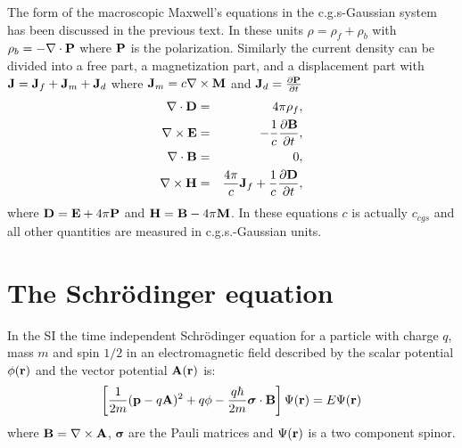 \documentclass[12pt,a4paper]{article}
\begin{document}
{\color{orange} The form of the macroscopic Maxwell's equations
in the c.g.s-Gaussian system has been discussed in the previous text.
In these units $\rho=\rho_f+\rho_b$ with $\rho_b=-\nabla \cdot {\bf P}$
where ${\bf P}$ is the polarization.
Similarly the current density can be divided into a free part, a 
magnetization part,
and a displacement part with ${\bf J}={\bf J}_f + {\bf J}_m + {\bf J}_d$ where
${\bf J}_m=c \nabla \times {\bf M}$ and ${\bf J}_d={\partial {\bf P}\over 
\partial t}$
\begin{eqnarray}
\nabla \cdot {\bf D} &=& 4 \pi \rho_f, \\
\nabla \times {\bf E} &=& -{1\over c} {\partial {\bf B} \over \partial t}, \\
\nabla \cdot {\bf B} &=& 0, \\
\nabla \times {\bf H} &=& {4 \pi \over c} {\bf J}_f+ {1\over c}
{\partial {\bf D} \over \partial t}, 
\end{eqnarray}
where ${\bf D}={\bf E} + 4 \pi {\bf P}$ and ${\bf H}={\bf B}- 4 \pi {\bf M}$.
In these equations $c$ is actually $c_{cgs}$ and all 
other quantities are measured in c.g.s.-Gaussian units.
}

\newpage
\section{\color{coral}The Schr\"odinger equation}
In the SI the time independent Schr\"odinger equation for a particle 
with charge $q$, mass $m$ and spin $1/2$ in an electromagnetic field 
described by the scalar potential $\phi({\bf r})$ and the vector
potential ${\bf A}({\bf r})$ is:
\begin{equation}
\left[{1\over 2m} ({\bf p}-q {\bf A})^2 + q \phi - 
{q \hbar \over 2 m} {\boldsymbol \sigma} \cdot {\bf B} \right]
\Psi({\bf r})=E \Psi({\bf r})
\end{equation}
where ${\bf B}=\nabla\times {\bf A}$, ${\boldsymbol \sigma}$ are the Pauli
matrices and $\Psi({\bf r})$ is a two component spinor.
\\
\end{document}
